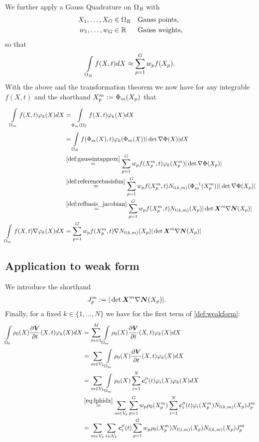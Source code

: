 We further apply a Gauss Quadrature on $\Omega_R$ with
\begin{align}
	X_1,\ldots,X_G  &\in \Omega_R &&\text{Gauss points},\\
	w_1,\ldots,w_G  &\in \mathbb{R} &&\text{Gauss weights},
\end{align}
so that
\begin{align}
	\int\limits_{\Omega_R}^{} f(X,t)dX \approx \sum\limits_{p=1}^{G} w_pf(X_p).\label{def:gaussintapprox}
\end{align}
With the above and the transformation theorem we now have for any integrable $f(X,t)$ and the shorthand $X^m_p := \Phi_m(X_p)$ that
\begin{align}
	\intl{\Omega_m}{}f(X,t)\varphi_k(X)dX &= \intl{\Phi_m(\Omega)}{}f(X,t)\varphi_k(X)dX\label{eq:fphidx}\\
	& = \intl{\Om}{}f(\Phi_m(X),t)\varphi_k(\Phi_m(X))|\det \nabla\Phi(X)|dX\nonumber\\
	& \re{def:gaussintapprox} \sumgp w_pf(\pmp,t)\varphi_k(\pmp)|\det \nabla\Phi(X_p)|\nonumber\\
	& \re{def:referencebasisfun} \sumgp w_pf(\pmp,t)N_{l(k,m)}(\Phi_m^{-1}(\pmp))|\det \nabla\Phi(X_p)|\nonumber\\
	& \re{def:refbasis_jacobian} \sumgp w_pf(\pmp,t)N_{l(k,m)}(X_p)|\det \vX^m\nabla\vN(X_p)|\nonumber\\
	\intl{\Omega_m}{}f(X,t)\nabla\varphi_k(X)dX &= \sumgp w_pf(\pmp,t)\nabla N_{l(k,m)}(X_p)|\det \vX^m\nabla\vN(X_p)|\label{eq:fgradphidx}
\end{align}

\subsection{Application to weak form}
We introduce the shorthand
\begin{align}
	J^m_p &:= |\det \boldsymbol{X}^m\nabla\boldsymbol{N}(X_p)|.\label{def:jacshorthand}
\end{align}
Finally, for a fixed $k\in\{1,\ldots, N\}$ we have for the first term of \eqref{def:weakform}:
\begin{align*}
	\intor \rho_0(X)\d{\vV}{t}(X,t)\varphi_k(X)dX
		&= \suml{m=1}{M}\intl{\Omega_m}{} \rho_0(X)\d{\vV}{t}(X,t)\varphi_k(X)dX\\
		&= \sumvk\intl{\Omega_m}{} \rho_0(X)\d{\vV}{t}(X,t)\varphi_k(X)dX\\  		
		&= \sumvk\intl{\Omega_m}{} \rho_0(X)\sumi \vc_i''(t)\varphi_i(X)\varphi_k(X)dX\\
		&\re{eq:fphidx} \sumvk\sumgp w_p \rho_0(\pmp)\sumi \vc_i''(t)\varphi_i(\pmp) N_{l(k,m)}(X_p)\jmp\\
		&= \sumvk\sumnk \vc_i''(t)\sumgp w_p \rho_0(\pmp)N_{l(i,m)}(X_p) N_{l(k,m)}(X_p)\jmp
\end{align*}

